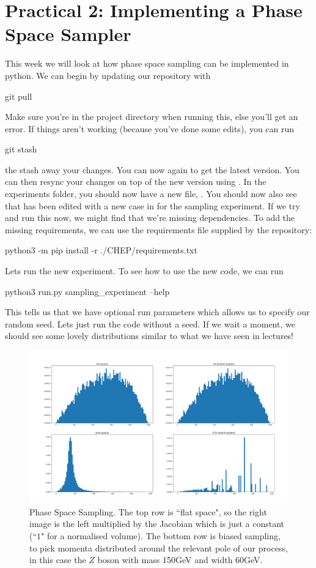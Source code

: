 \section*{Practical 2: Implementing a Phase Space Sampler}


This week we will look at how phase space sampling can be implemented in python. We can begin by updating our repository with 
\begin{codeenv}
    git pull
\end{codeenv}
Make sure you're in the project directory when running this, else you'll get an error. If things aren't working (because you've done some edits), you can run
\begin{codeenv}
    git stash
\end{codeenv}
the stash away your changes. You can now  again to get the latest version. You can then resync your changes on top of the new version using .
In the experiments folder, you should now have a new file, .
You should now also see that  has been edited with a new case in  for the sampling experiment. If we try and run this now, we might find that we're missing dependencies. To add the missing requirements, we can use the requirements file supplied by the repository:
\begin{codeenv}
    python3 -m pip install -r ./CHEP/requirements.txt
\end{codeenv}
Lets run the new experiment. To see how to use the new code, we can run
\begin{codeenv}
    python3 run.py sampling_experiment --help
\end{codeenv}
This tells us that we have optional run parameters which allows us to specify our random seed. Lets just run the code without a seed. If we wait a moment, we should see some lovely distributions similar to what we have seen in lectures!

\begin{figure}[H]
    \centering
    \includegraphics[width=0.75\linewidth]{tex/ims/phasespace1.png}
    \caption{Phase Space Sampling. The top row is ``flat space", so the right image is the left multiplied by the Jacobian which is just a constant (``$1$" for a normalised volume). The bottom row is biased sampling, to pick momenta distributed around the relevant pole of our process, in this case the $Z$ boson with mass 150GeV and width 60GeV.}
    \label{fig:enter-label}
\end{figure}


